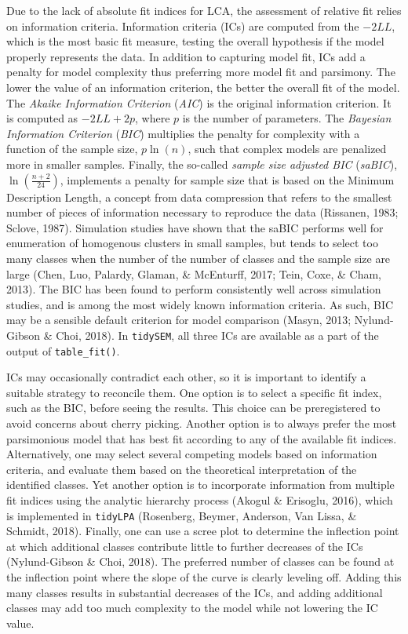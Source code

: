 \documentclass[
  ,man,floatsintext]{apa6}
\begin{document}
Due to the lack of absolute fit indices for LCA, the assessment of relative fit
relies on information criteria.
Information criteria (ICs) are computed from the \(-2LL\),
which is the most basic fit measure, testing the overall hypothesis if the model properly represents the data.
In addition to capturing model fit, ICs add a penalty for model complexity thus
preferring more model fit and parsimony.
The lower the value of an information criterion, the better the overall fit of the
model.
The \emph{Akaike Information Criterion} (\emph{AIC}) is the original information criterion.
It is computed as \(-2LL+2p\), where \(p\) is the number of parameters.
The \emph{Bayesian Information Criterion} (\emph{BIC}) multiplies the penalty for complexity with a function of the sample size, \(p \ln(n)\),
such that complex models are penalized more in smaller samples.
Finally,
the so-called \emph{sample size adjusted BIC} (\emph{saBIC}), \(\ln(\frac{n + 2}{24})\),
implements a penalty for sample size that is based on the Minimum Description Length, a concept from data compression that refers to the smallest number of pieces of information necessary to reproduce the data (Rissanen, 1983; Sclove, 1987).
Simulation studies have shown that the saBIC performs well for enumeration of homogenous clusters in small samples,
but tends to select too many classes when the number of the number of classes and the sample size are large (Chen, Luo, Palardy, Glaman, \& McEnturff, 2017; Tein, Coxe, \& Cham, 2013).
The BIC has been found to perform consistently well across simulation studies,
and is among the most widely known information criteria.
As such, BIC may be a sensible default criterion for model comparison (Masyn, 2013; Nylund-Gibson \& Choi, 2018).
In \texttt{tidySEM}, all three ICs are available as a part of the output of \texttt{table\_fit()}.

ICs may occasionally contradict each other, so it is
important to identify a suitable strategy to reconcile them.
One option is to select a specific fit index, such as the BIC,
before seeing the results.
This choice can be preregistered to avoid concerns about cherry picking.
Another option is to always prefer the most parsimonious model that has best fit according to any of the available fit indices.
Alternatively, one may select several competing models based on information criteria,
and evaluate them based on the theoretical interpretation of the identified classes.
Yet another option is to incorporate information from multiple fit indices using the analytic hierarchy process (Akogul \& Erisoglu, 2016),
which is implemented in \texttt{tidyLPA} (Rosenberg, Beymer, Anderson, Van Lissa, \& Schmidt, 2018).
Finally, one can use a scree plot to determine the inflection point at which additional classes contribute little to further decreases of the ICs (Nylund-Gibson \& Choi, 2018).
The preferred number of classes can be found at the inflection point where the slope of the curve is clearly leveling off.
Adding this many classes results in substantial decreases of the ICs,
and adding additional classes may add too much complexity to the model while not lowering the IC value.
\end{document}
